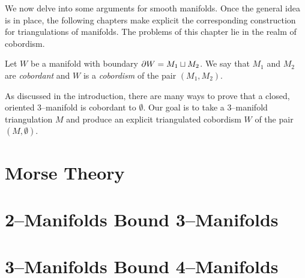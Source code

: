 We now delve into some arguments for smooth manifolds.
Once the general idea is in place, the following chapters make explicit the corresponding construction for triangulations of manifolds.
The problems of this chapter lie in the realm of cobordism.
\begin{defn}
  \label{def:cobordism}
  Let $W$ be a manifold with boundary $\partial W=M_1\sqcup M_2$.
  We say that $M_1$ and $M_2$ are \emph{cobordant} and $W$ is a \emph{cobordism} of the pair $(M_1,M_2)$.
\end{defn}
As discussed in the introduction, there are many ways to prove that a closed, oriented 3--manifold is cobordant to $\emptyset$.
Our goal is to take a 3--manifold triangulation $M$ and produce an explicit triangulated cobordism $W$ of the pair $(M,\emptyset)$.

\section{Morse Theory}


\section{2--Manifolds Bound 3--Manifolds}


\section{3--Manifolds Bound 4--Manifolds}


%
